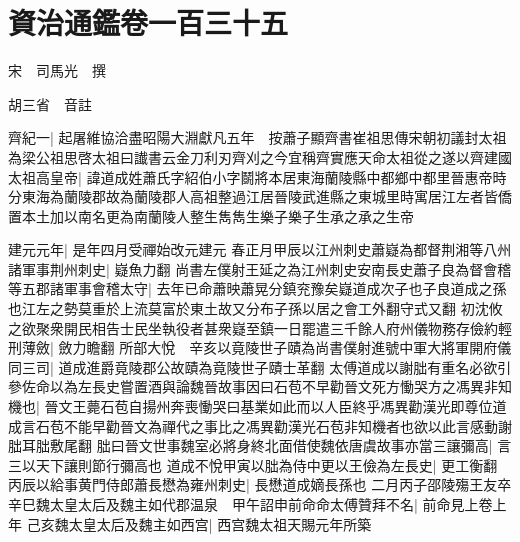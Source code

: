 \chapter{資治通鑑卷一百三十五}
宋　司馬光　撰

胡三省　音註

齊紀一|{
	起屠維協洽盡昭陽大淵獻凡五年　按蕭子顯齊書崔祖思傳宋朝初議封太祖為梁公祖思啓太祖曰䜟書云金刀利刃齊刈之今宜稱齊實應天命太祖從之遂以齊建國}
太祖高皇帝|{
	諱道成姓蕭氏字紹伯小字鬬將本居東海蘭陵縣中都鄉中都里晉惠帝時分東海為蘭陵郡故為蘭陵郡人高祖整過江居晉陵武進縣之東城里時寓居江左者皆僑置本土加以南名更為南蘭陵人整生雋雋生樂子樂子生承之承之生帝}


建元元年|{
	是年四月受禪始改元建元}
春正月甲辰以江州刺史蕭嶷為都督荆湘等八州諸軍事荆州刺史|{
	嶷魚力翻}
尚書左僕射王延之為江州刺史安南長史蕭子良為督會稽等五郡諸軍事會稽太守|{
	去年已命蕭映蕭晃分鎮兖豫矣嶷道成次子也子良道成之孫也江左之勢莫重於上流莫富於東土故又分布子孫以居之會工外翻守式又翻}
初沈攸之欲聚衆開民相告士民坐執役者甚衆嶷至鎮一日罷遣三千餘人府州儀物務存儉約輕刑薄斂|{
	斂力瞻翻}
所部大悅　辛亥以竟陵世子賾為尚書僕射進號中軍大將軍開府儀同三司|{
	道成進爵竟陵郡公故賾為竟陵世子賾士革翻}
太傅道成以謝朏有重名必欲引參佐命以為左長史嘗置酒與論魏晉故事因曰石苞不早勸晉文死方慟哭方之馮異非知機也|{
	晉文王薨石苞自揚州奔喪慟哭曰基業如此而以人臣終乎馮異勸漢光即尊位道成言石苞不能早勸晉文為禪代之事比之馮異勸漢光石苞非知機者也欲以此言感動謝朏耳朏敷尾翻}
朏曰晉文世事魏室必將身終北面借使魏依唐虞故事亦當三讓彌高|{
	言三以天下讓則節行彌高也}
道成不悅甲寅以朏為侍中更以王儉為左長史|{
	更工衡翻}
丙辰以給事黄門侍郎蕭長懋為雍州刺史|{
	長懋道成嫡長孫也}
二月丙子邵陵殤王友卒　辛巳魏太皇太后及魏主如代郡温泉　甲午詔申前命命太傅贊拜不名|{
	前命見上卷上年}
己亥魏太皇太后及魏主如西宫|{
	西宫魏太祖天賜元年所築}


